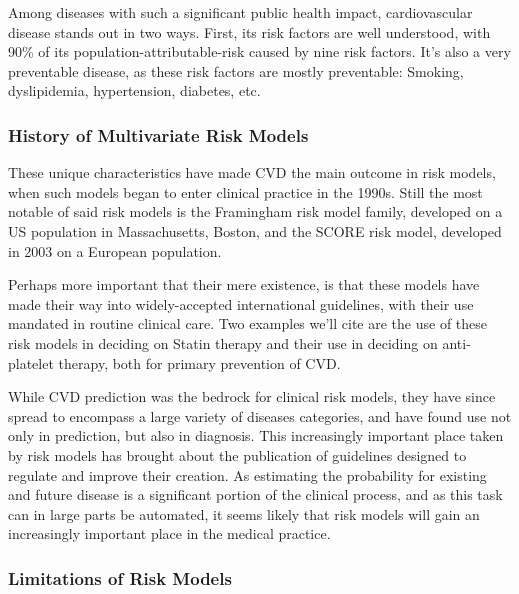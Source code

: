 \documentclass[a4paper,12pt]{article}
\begin{document}
		Among diseases with such a significant public health impact, cardiovascular disease stands out in two ways. First, its risk factors are well understood, with 90\% of its population-attributable-risk caused by nine risk factors. It's also a very preventable disease, as these risk factors are mostly preventable\cite{Yusuf2004,ODonnell2016}: Smoking, dyslipidemia, hypertension, diabetes, etc.
		
		\subsubsection{History of Multivariate Risk Models}
		
		These unique characteristics have made CVD the main outcome in risk models, when such models began to enter clinical practice in the 1990s\cite{Wilson1998,NationalCholesterolEducationProgramNCEPExpertPanelonDetection2002,Conroy2003,Hippisley-Cox2007,DAgostino2008,Hippisley-Cox2008,Goff2014}. Still the most notable of said risk models is the Framingham risk model family, developed on a US population in Massachusetts, Boston\cite{Wilson1998}, and the SCORE risk model, developed in 2003 on a European population\cite{Conroy2003}.
		
		Perhaps more important that their mere existence, is that these models have made their way into widely-accepted international guidelines, with their use mandated in routine clinical care. Two examples we'll cite are the use of these risk models in deciding on Statin therapy\cite{Goff2014} and their use in deciding on anti-platelet therapy\cite{Bibbins-Domingo2016}, both for primary prevention of CVD.
		
		While CVD prediction was the bedrock for clinical risk models, they have since spread to encompass a large variety of diseases categories\cite{Kanis2008,Kansagara2011}, and have found use not only in prediction, but also in diagnosis\cite{Usher-Smith2016}. This increasingly important place taken by risk models has brought about the publication of guidelines designed to regulate and improve their creation\cite{Collins2015}. As estimating the probability for existing and future disease is a significant portion of the clinical process\cite{Moons2009}, and as this task can in large parts be automated, it seems likely that risk models will gain an increasingly important place in the medical practice.
		
		\subsubsection{Limitations of Risk Models}
		
\end{document}
